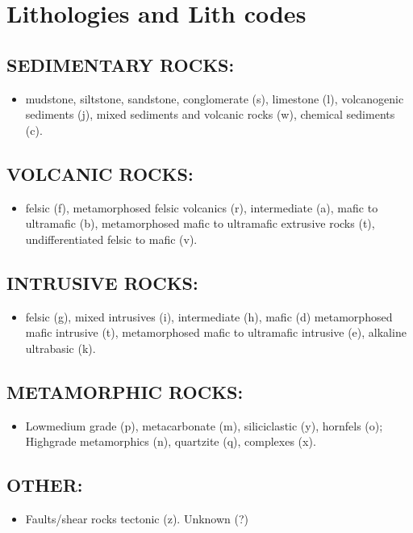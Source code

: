 \documentclass[letterpaper,10pt,english]{sphinxmanual}
\begin{document}
\section{Lithologies and Lith codes}
\label{\detokenize{legend:lithologies-and-lith-codes}}

\subsection{SEDIMENTARY ROCKS:}
\label{\detokenize{legend:sedimentary-rocks}}\begin{itemize}
\item {} 
mudstone, siltstone, sandstone, conglomerate (s), limestone (l), volcanogenic sediments (j), mixed sediments and volcanic rocks (w), chemical sediments (c).

\end{itemize}


\subsection{VOLCANIC ROCKS:}
\label{\detokenize{legend:volcanic-rocks}}\begin{itemize}
\item {} 
felsic (f), metamorphosed felsic volcanics (r), intermediate (a), mafic to ultramafic (b), metamorphosed mafic to ultramafic extrusive rocks (t), undifferentiated felsic to mafic (v).

\end{itemize}


\subsection{INTRUSIVE ROCKS:}
\label{\detokenize{legend:intrusive-rocks}}\begin{itemize}
\item {} 
felsic (g), mixed intrusives (i), intermediate (h), mafic (d) metamorphosed mafic intrusive (t), metamorphosed mafic to ultramafic intrusive (e), alkaline ultrabasic (k).

\end{itemize}


\subsection{METAMORPHIC ROCKS:}
\label{\detokenize{legend:metamorphic-rocks}}\begin{itemize}
\item {} 
Low\sphinxhyphen{}medium grade (p), metacarbonate (m), siliciclastic (y), hornfels (o); High\sphinxhyphen{}grade metamorphics (n), quartzite (q), complexes (x).

\end{itemize}


\subsection{OTHER:}
\label{\detokenize{legend:other}}\begin{itemize}
\item {} 
Faults/shear rocks tectonic (z). Unknown (?)

\end{itemize}




\renewcommand{\indexname}{Index}
\printindex
\end{document}
